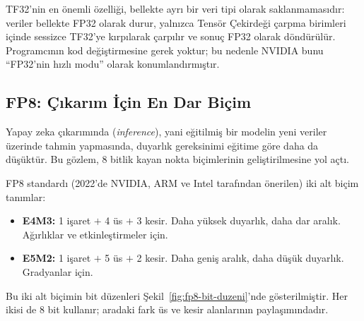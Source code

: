 TF32'nin en önemli özelliği, bellekte ayrı bir veri tipi olarak saklanmamasıdır: veriler bellekte FP32 olarak durur, yalnızca Tensör Çekirdeği çarpma birimleri içinde sessizce TF32'ye kırpılarak çarpılır ve sonuç FP32 olarak döndürülür. Programcının kod değiştirmesine gerek yoktur; bu nedenle NVIDIA bunu ``FP32'nin hızlı modu'' olarak konumlandırmıştır.

\subsection{FP8: Çıkarım İçin En Dar Biçim}

Yapay zeka çıkarımında (\emph{inference}), yani eğitilmiş bir modelin yeni veriler üzerinde tahmin yapmasında, duyarlık gereksinimi eğitime göre daha da düşüktür. Bu gözlem, 8 bitlik kayan nokta biçimlerinin geliştirilmesine yol açtı.

FP8 standardı (2022'de NVIDIA, ARM ve Intel tarafından önerilen) iki alt biçim tanımlar:
\begin{itemize}
  \item \textbf{E4M3:} 1 işaret $+$ 4 üs $+$ 3 kesir. Daha yüksek duyarlık, daha dar aralık. Ağırlıklar ve etkinleştirmeler için.
  \item \textbf{E5M2:} 1 işaret $+$ 5 üs $+$ 2 kesir. Daha geniş aralık, daha düşük duyarlık. Gradyanlar için.
\end{itemize}

Bu iki alt biçimin bit düzenleri Şekil~\ref{fig:fp8-bit-duzeni}'nde gösterilmiştir. Her ikisi de 8 bit kullanır; aradaki fark üs ve kesir alanlarının paylaşımındadır.

